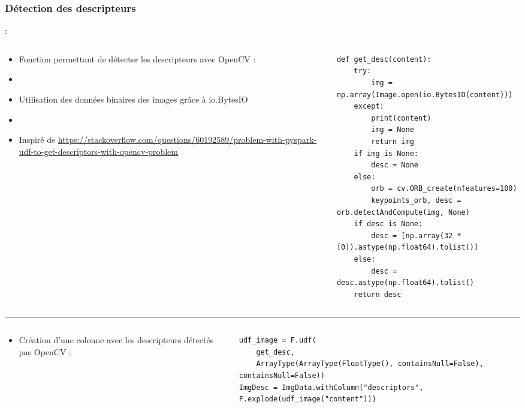 \documentclass[8pt,aspectratio=169,hyperref={unicode=true}]{beamer}
\begin{document}
\subsubsection{Détection des descripteurs}
\begin{frame}[fragile]{\insertsubsection : \insertsubsubsection}
  \begin{columns}
    \begin{column}{.3\textwidth}
      \begin{itemize}
        \item Fonction permettant de détecter les descripteurs avec OpenCV :
        \item[]
        \item Utilisation des données binaires des images grâce à io.BytesIO
        \item[]
        \item Inspiré de \url{https://stackoverflow.com/questions/60192589/problem-with-pyspark-udf-to-get-descriptors-with-opencv-problem}
      \end{itemize}
    \end{column}
    \begin{column}{.7\textwidth}
      \begin{verbatim}
def get_desc(content):
    try:
        img = np.array(Image.open(io.BytesIO(content)))
    except:
        print(content)
        img = None
        return img
    if img is None:
        desc = None
    else:
        orb = cv.ORB_create(nfeatures=100)
        keypoints_orb, desc = orb.detectAndCompute(img, None)
    if desc is None:
        desc = [np.array(32 * [0]).astype(np.float64).tolist()]
    else:
        desc = desc.astype(np.float64).tolist()
    return desc
      \end{verbatim}
    \end{column}
  \end{columns}
  \vspace{3px}
  \hrule
  \begin{columns}
    \begin{column}{.25\textwidth}
      \begin{itemize}
        \item Création d'une colonne avec les descripteurs détectés pas OpenCV :
      \end{itemize}
    \end{column}
    \begin{column}{.75\textwidth}
      \begin{verbatim}
udf_image = F.udf(
    get_desc,
    ArrayType(ArrayType(FloatType(), containsNull=False), containsNull=False))
ImgDesc = ImgData.withColumn("descriptors", F.explode(udf_image("content")))  
      \end{verbatim}
    \end{column}
  \end{columns}
\end{frame}
\end{document}
